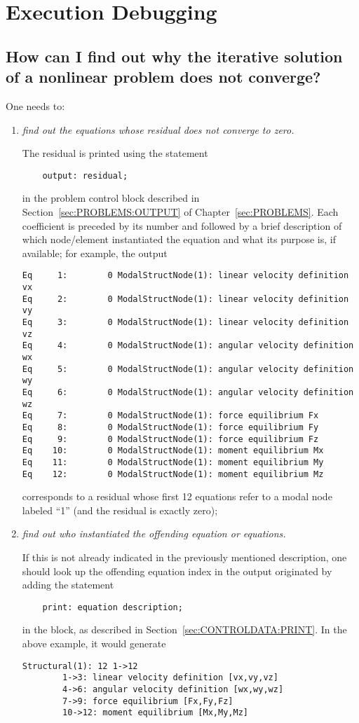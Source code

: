 \section{Execution Debugging}
\subsection{How can I find out why the iterative solution
of a nonlinear problem does not converge?}

One needs to:
\begin{enumerate}
\item \emph{find out the equations whose residual does not converge to zero.}

The residual is printed using the statement
\begin{verbatim}
    output: residual;
\end{verbatim}
in the problem control block described
in Section~\ref{sec:PROBLEMS:OUTPUT} of Chapter~\ref{sec:PROBLEMS}.
Each coefficient is preceded by its number
and followed by a brief description of which node/element instantiated
the equation and what its purpose is, if available;
for example, the output
\begin{verbatim}
Eq     1:        0 ModalStructNode(1): linear velocity definition vx
Eq     2:        0 ModalStructNode(1): linear velocity definition vy
Eq     3:        0 ModalStructNode(1): linear velocity definition vz
Eq     4:        0 ModalStructNode(1): angular velocity definition wx
Eq     5:        0 ModalStructNode(1): angular velocity definition wy
Eq     6:        0 ModalStructNode(1): angular velocity definition wz
Eq     7:        0 ModalStructNode(1): force equilibrium Fx
Eq     8:        0 ModalStructNode(1): force equilibrium Fy
Eq     9:        0 ModalStructNode(1): force equilibrium Fz
Eq    10:        0 ModalStructNode(1): moment equilibrium Mx
Eq    11:        0 ModalStructNode(1): moment equilibrium My
Eq    12:        0 ModalStructNode(1): moment equilibrium Mz
\end{verbatim}
corresponds to a residual whose first 12 equations refer to a modal node
labeled ``1'' (and the residual is exactly zero);

\item \emph{find out who instantiated the offending equation or equations.}

If this is not already indicated in the previously mentioned description,
one should look up the offending equation index in the output originated
by adding the statement
\begin{verbatim}
    print: equation description;
\end{verbatim}
in the  block, as described
in Section~\ref{sec:CONTROLDATA:PRINT}.
In the above example, it would generate
\begin{verbatim}
Structural(1): 12 1->12
        1->3: linear velocity definition [vx,vy,vz]
        4->6: angular velocity definition [wx,wy,wz]
        7->9: force equilibrium [Fx,Fy,Fz]
        10->12: moment equilibrium [Mx,My,Mz]
\end{verbatim}


\end{enumerate}
